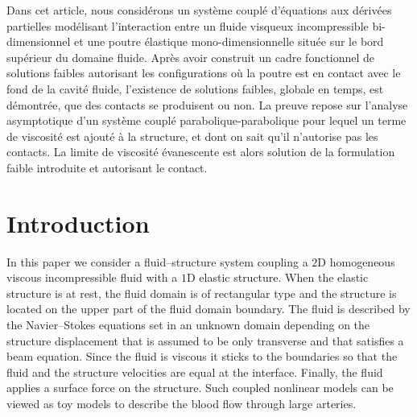 \documentclass[JEP,XML,SOM,Unicode,NoFloatCountersInSection]{cedram}
\theoremstyle{remark}
\theoremstyle{definition}
\begin{document}
\begin{altabstract}
Dans cet article, nous considérons un système couplé d’équations aux dérivées partielles modélisant l'interaction entre un fluide visqueux incompressible bi-dimensionnel et une poutre élastique mono-dimensionnelle située sur le bord supérieur du domaine fluide. Après avoir construit un cadre fonctionnel de solutions faibles autorisant les configurations où la poutre est en contact avec le fond de la cavité fluide, l’existence de solutions faibles, globale en temps, est démontrée, que des contacts se produisent ou non. La preuve repose sur l’analyse asymptotique d’un système couplé parabolique-parabolique pour lequel un terme de viscosité est ajouté à la structure, et dont on sait qu’il n’autorise pas les contacts. La limite de viscosité évanescente est alors solution de la formulation faible introduite et autorisant le contact.\end{altabstract}

\maketitle
\vspace*{-\baselineskip}\enlargethispage{.5\baselineskip}%
\tableofcontents
\mainmatter

\section{Introduction}

In this paper we consider a fluid--structure system coupling a $2$D homogeneous viscous incompressible fluid with a $1$D
elastic structure. When the elastic structure is at rest, the fluid domain is of rectangular type and the structure is located on the upper part of the fluid domain boundary. The fluid is described by the Navier--Stokes equations set in an unknown domain depending on the structure displacement that is assumed to be only transverse and that satisfies a beam equation. Since the fluid is viscous it sticks to the boundaries so that the fluid and the structure velocities are equal at the interface. Finally, the fluid applies a surface force on the structure. Such coupled nonlinear models can be viewed as toy models to describe the blood flow through large arteries.\enlargethispage{\baselineskip}%
\end{document}
